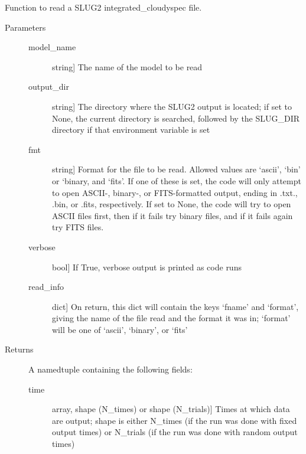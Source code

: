 \documentclass[letterpaper,10pt,english]{sphinxmanual}
\begin{document}
\begin{fulllineitems}
\label{\detokenize{cloudy:slugpy.cloudy.read_integrated_cloudyspec}}
Function to read a SLUG2 integrated\_cloudyspec file.
\begin{description}
\item[{Parameters}] \leavevmode\begin{description}
\item[{model\_name}] \leavevmode{[}string{]}
The name of the model to be read

\item[{output\_dir}] \leavevmode{[}string{]}
The directory where the SLUG2 output is located; if set to None,
the current directory is searched, followed by the SLUG\_DIR
directory if that environment variable is set

\item[{fmt}] \leavevmode{[}string{]}
Format for the file to be read. Allowed values are ‘ascii’,
‘bin’ or ‘binary, and ‘fits’. If one of these is set, the code
will only attempt to open ASCII-, binary-, or FITS-formatted
output, ending in .txt., .bin, or .fits, respectively. If set
to None, the code will try to open ASCII files first, then if
it fails try binary files, and if it fails again try FITS
files.

\item[{verbose}] \leavevmode{[}bool{]}
If True, verbose output is printed as code runs

\item[{read\_info}] \leavevmode{[}dict{]}
On return, this dict will contain the keys ‘fname’ and
‘format’, giving the name of the file read and the format it
was in; ‘format’ will be one of ‘ascii’, ‘binary’, or ‘fits’

\end{description}

\item[{Returns}] \leavevmode
A namedtuple containing the following fields:
\begin{description}
\item[{time}] \leavevmode{[}array, shape (N\_times) or shape (N\_trials){]}
Times at which data are output; shape is either N\_times (if
the run was done with fixed output times) or N\_trials (if
the run was done with random output times)


\end{description}
\end{description}
\end{fulllineitems}
\end{document}
